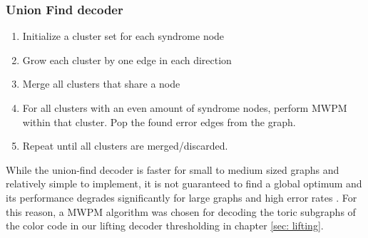 \subsubsection{Union Find decoder}
\begin{enumerate}
    \item Initialize a cluster set for each syndrome node
    \item Grow each cluster by one edge in each direction
    \item Merge all clusters that share a node
    \item For all clusters with an even amount of syndrome nodes,
    perform MWPM within that cluster. Pop the found error edges from
    the graph.
    \item Repeat until all clusters are merged/discarded.
\end{enumerate}
While the union-find decoder is faster for small to medium
sized graphs and relatively simple to implement,
 it is not guaranteed to find a global optimum
and its performance degrades significantly for large
graphs and high error rates \cite{UFDecoder}.
For this reason, a MWPM algorithm was chosen for decoding the toric
subgraphs of the color code in our lifting decoder thresholding
in chapter \ref{sec: lifting}.